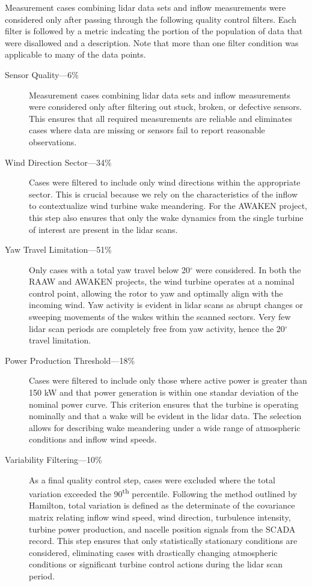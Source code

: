 \documentclass[%
 aip,
 amsmath,
 amssymb,
]{revtex4-2}
\begin{document}
Measurement cases combining lidar data sets and inflow measurements were considered only after passing through the following quality control filters. Each filter is followed by a metric indcating the portion of the population of data that were disallowed and a description. Note that more than one filter condition was applicable to many of the data points.
\begin{description}
  \item[Sensor Quality---6\%] Measurement cases combining lidar data sets and inflow measurements were considered only after filtering out stuck, broken, or defective sensors. This ensures that all required measurements are reliable and eliminates cases where data are missing or sensors fail to report reasonable observations.
  \item[Wind Direction Sector---34\%] Cases were filtered to include only wind directions within the appropriate sector. This is crucial because we rely on the characteristics of the inflow to contextualize wind turbine wake meandering. For the AWAKEN project, this step also ensures that only the wake dynamics from the single turbine of interest are present in the lidar scans.
  \item[Yaw Travel Limitation---51\%] Only cases with a total yaw travel below 20$^\circ$ were considered. In both the RAAW and AWAKEN projects, the wind turbine operates at a nominal control point, allowing the rotor to yaw and optimally align with the incoming wind. Yaw activity is evident in lidar scans as abrupt changes or sweeping movements of the wakes within the scanned sectors. Very few lidar scan periods are completely free from yaw activity, hence the 20$^\circ$ travel limitation.
  \item[Power Production Threshold---18\%] Cases were filtered to include only those where active power is greater than 150 kW and that power generation is within one standar deviation of the nominal power curve. This criterion ensures that the turbine is operating nominally and that a wake will be evident in the lidar data. The selection allows for describing wake meandering under a wide range of atmospheric conditions and inflow wind speeds.
  \item[Variability Filtering---10\%] As a final quality control step, cases were excluded where the total variation exceeded the 90\textsuperscript{th} percentile. Following the method outlined by Hamilton,\cite{hamilton2020atmospheric} total variation is defined as the determinate of the covariance matrix relating inflow wind speed, wind direction, turbulence intensity, turbine power production, and nacelle position signals from the SCADA record. This step ensures that only statistically stationary conditions are considered, eliminating cases with drastically changing atmospheric conditions or significant turbine control actions during the lidar scan period.
\end{description}
\end{document}
